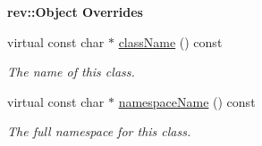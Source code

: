 \begin{Indent}\textbf{ rev\+::Object Overrides}\par
\begin{DoxyCompactItemize}
\item 
virtual const char $\ast$ \mbox{\hyperlink{classrev_1_1_shader_program_a7400b2b50638b1d150bc339ecd360c4c}{class\+Name}} () const
\begin{DoxyCompactList}\small\item\em The name of this class. \end{DoxyCompactList}\item 
virtual const char $\ast$ \mbox{\hyperlink{classrev_1_1_shader_program_a7e4e75492bd44ea8e9350cd720698e3e}{namespace\+Name}} () const
\begin{DoxyCompactList}\small\item\em The full namespace for this class. \end{DoxyCompactList}\end{DoxyCompactItemize}
\end{Indent}
